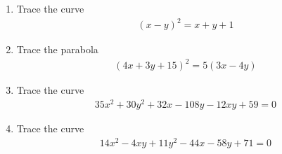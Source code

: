 \renewcommand{\theequation}{\theenumi}
\renewcommand{\thefigure}{\theenumi}
\begin{enumerate}[label=\thesubsection.\arabic*.,ref=\thesubsection.\theenumi]
%
\item 	Trace the curve 
	\begin{align}
	\left(x-y\right)^2 = x+y+1
	\label{eq:solutions/41/2/eq0}
	\end{align}
%
\solution

%
\item Trace the parabola
\begin{align}
    (4x+3y+15)^2=5(3x-4y)
\end{align}
%
\solution

%
\item Trace the curve
\begin{align}
35x^2+30y^2+32x-108y-12xy+59=0 \label{eq:solutions/41/ex/given_curve_eq}
\end{align}
%
\solution

\item Trace the curve
\begin{align}
14x^2 - 4xy + 11y^2 - 44x - 58y + 71 =0  \label{eq:solutions/41/ex1/given_curve_eq}
\end{align}

\solution


\end{enumerate}
